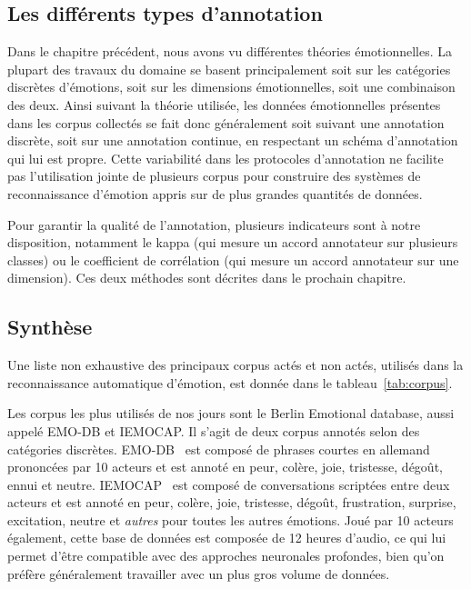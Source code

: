 \subsection{Les différents types d'annotation}
Dans le chapitre précédent, nous avons vu différentes théories émotionnelles. La plupart des travaux du domaine se basent principalement soit sur les catégories discrètes d'émotions, soit sur les dimensions émotionnelles, soit une combinaison des deux. Ainsi  suivant la théorie utilisée, les données émotionnelles présentes dans les corpus collectés se fait donc généralement soit suivant une annotation discrète, soit sur une annotation continue, en respectant un schéma d'annotation qui lui est propre. Cette variabilité dans les protocoles d'annotation ne facilite pas l'utilisation jointe de plusieurs corpus pour construire des systèmes de reconnaissance d'émotion appris sur de plus grandes quantités de données.

Pour garantir la qualité de l'annotation, plusieurs indicateurs sont à notre disposition, notamment le kappa (qui mesure un accord annotateur sur plusieurs classes) ou le coefficient de corrélation (qui mesure un accord annotateur sur une dimension). Ces deux méthodes sont décrites dans le prochain chapitre.

\subsection{Synthèse}



Une liste non exhaustive des principaux corpus actés et non actés, utilisés dans la reconnaissance automatique d'émotion, est donnée dans le tableau~\ref{tab:corpus}.

Les corpus les plus utilisés de nos jours sont le Berlin Emotional database, aussi appelé EMO-DB et IEMOCAP. Il s'agit de deux corpus annotés selon des catégories discrètes. EMO-DB~\cite{Burkhardt2005} est composé de phrases courtes en allemand prononcées par 10 acteurs et est annoté en peur, colère, joie, tristesse, dégoût, ennui et neutre. IEMOCAP~\cite{Busso2007} est composé de conversations scriptées entre deux acteurs et est annoté en peur, colère, joie, tristesse, dégoût, frustration, surprise, excitation, neutre et \textit{autres} pour toutes les autres émotions. Joué par 10 acteurs également, cette base de données est composée de 12 heures d'audio, ce qui lui permet d'être compatible avec des approches neuronales profondes, bien qu'on préfère généralement travailler avec un plus gros volume de données.

